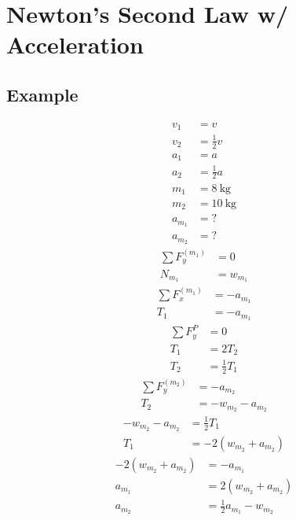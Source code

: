 \documentclass{article}
\begin{document}
\newcommand{\hr}{\par\noindent\rule{\textwidth}{0.4pt}}

\newcommand{\bc}[1]{
	\begin{equation*}
		\begin{boxed}
			{#1}
		\end{boxed}
	\end{equation*}
}

\newcommand{\cond}[2]{
	\ifmmode
		{#1} \quad {#2}
	\else
		$$ {#1} \quad {#2} $$
	\fi
}

\tableofcontents

\section{Newton's Second Law w/ Acceleration}

\subsection{Example}
\begin{align*}
	v_1 & = v \\
	v_2 & = \frac{1}{2}v \\
	a_1 & = a \\
	a_2 & = \frac{1}{2}a \\
	m_1 & = \SI{8}{\kilogram} \\
	m_2 & = \SI{10}{\kilogram} \\
	a_{m_1} & = ? \\
	a_{m_2} & = ?
\end{align*}
\begin{align*}
	\sum F_y^{(m_1)} & = 0 \\
	N_{m_1} & = w_{m_1}
\end{align*}
\begin{align*}
	\sum F_x^{(m_1)} & = -a_{m_1} \\
	T_1 & = -a_{m_1}
\end{align*}
\begin{align*}
	\sum F_y^{P} & = 0 \\
	T_1 & = 2T_2 \\
	T_2 & = \frac{1}{2}T_1
\end{align*}
\begin{align*}
	\sum F_y^{(m_2)} & = -a_{m_2} \\
	T_2 & = -w_{m_2} - a_{m_2}
\end{align*}
\begin{align*}
	-w_{m_2} - a_{m_2} & = \frac{1}{2}T_1 \\
	T_1 & = -2(w_{m_2} + a_{m_2})
\end{align*}
\begin{align*}
	-2(w_{m_2} + a_{m_2}) & = -a_{m_1} \\
	a_{m_1} & = 2(w_{m_2} + a_{m_2}) \\
	a_{m_2} & = \frac{1}{2}a_{m_1} - w_{m_2}
\end{align*}
\end{document}
